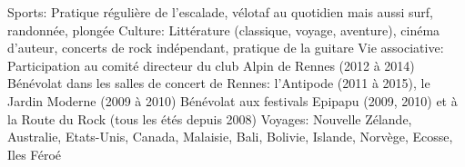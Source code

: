 \begin{cvskills}
  \cvskill
    {Sports:}
	{Pratique régulière de l'escalade, vélotaf au quotidien mais aussi surf, 
	 randonnée, plongée}
  \cvskill
    {Culture:}
	{
		Littérature (classique, voyage, aventure), cinéma d'auteur, concerts de 
	 	rock indépendant, pratique de la guitare
	}
  \cvskill
    {Vie associative:}
	{
		Participation au comité directeur du club Alpin de Rennes (2012 à 2014)
		\newline
		Bénévolat dans les salles de concert de Rennes: l'Antipode (2011 à 2015),
		le Jardin Moderne (2009 à 2010) \newline 
		Bénévolat aux festivals Epipapu (2009, 2010) et à la Route du Rock (tous les étés depuis 2008)}
  \cvskill
    {Voyages:}
	{Nouvelle Zélande, Australie, Etats-Unis, Canada, Malaisie, 
	 Bali, Bolivie, Islande, Norvège, Ecosse, Iles Féroé}
\end{cvskills}
